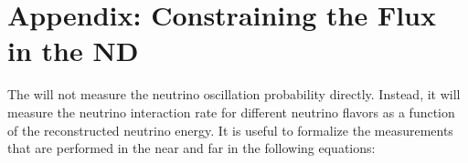\chapter{Appendix: Constraining the Flux in the ND}
\label{sec:appx-nd:fluxappendix}

The    will not measure the neutrino oscillation probability directly. Instead, it will measure the neutrino interaction rate for different neutrino flavors as a function of the reconstructed neutrino energy. It is useful to formalize the measurements that are performed in the near and  far  in the following equations:

